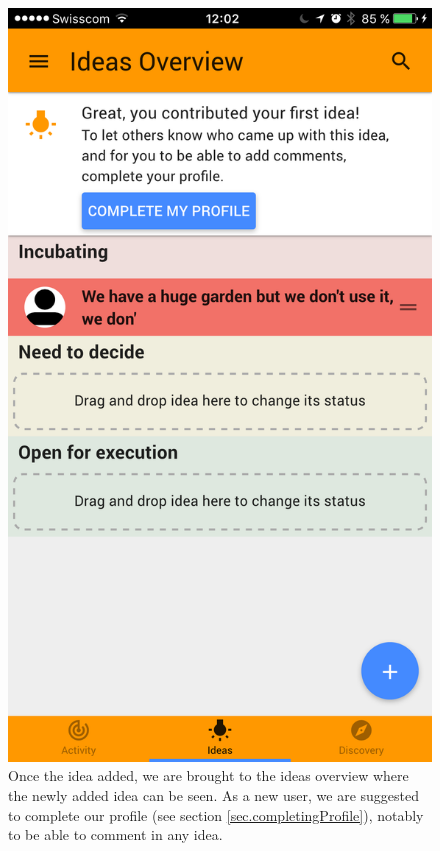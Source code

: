 \documentclass[a4paper,12pt,twoside]{article}
\begin{document}
\begin{figure}[!htb]
    \hfill
    \begin{minipage}[t]{.32\textwidth}
        \centering
        \includegraphics[width=\textwidth]{images/flow_addIdea_3.png}
        \caption{Once the idea added, we are brought to the ideas overview where the newly added idea can be seen. As a new user, we are suggested to complete our profile (see section \ref{sec.completingProfile}), notably to be able to comment in any idea.}
    \end{minipage}
\end{figure}
\end{document}
